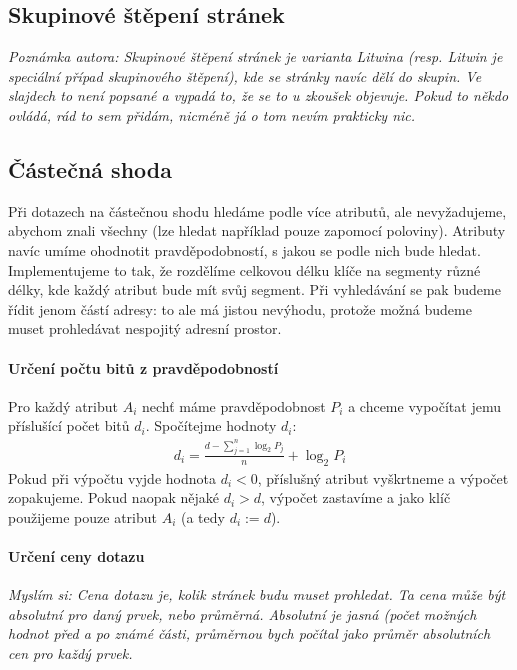 \documentclass[a4paper,12pt]{article}
\begin{document}
\subsection{Skupinové štěpení stránek}
\setcounter{equation}{0}
\textit{Poznámka autora: Skupinové štěpení stránek je varianta Litwina (resp.  
Litwin je speciální případ skupinového štěpení), kde se stránky navíc dělí do 
skupin.  Ve slajdech to není popsané a vypadá to, že se to u zkoušek objevuje.  
Pokud to někdo ovládá, rád to sem přidám, nicméně já o tom nevím prakticky nic.}


\subsection{Částečná shoda}
\setcounter{equation}{0}
Při dotazech na částečnou shodu hledáme podle více atributů, ale nevyžadujeme, 
abychom znali všechny (lze hledat například pouze zapomocí poloviny). Atributy 
navíc umíme ohodnotit pravděpodobností, s jakou se podle nich bude hledat.  
Implementujeme to tak, že rozdělíme celkovou délku klíče na segmenty různé 
délky, kde každý atribut bude mít svůj segment. Při vyhledávání se pak budeme 
řídit jenom částí adresy: to ale má jistou nevýhodu, protože možná budeme muset 
prohledávat nespojitý adresní prostor.

\paragraph{Určení počtu bitů z pravděpodobností}
Pro každý atribut $A_i$ nechť máme pravděpodobnost $P_i$ a chceme vypočítat jemu 
příslušící počet bitů $d_i$. Spočítejme hodnoty $d_i$:
\begin{align}
	d_i = \frac{ d - \sum_{j = 1}^n \log_2 P_j}{n} + \log_2 P_i
\end{align}
Pokud při výpočtu vyjde hodnota $d_i < 0$, příslušný atribut vyškrtneme a 
výpočet zopakujeme. Pokud naopak nějaké $d_i > d$, výpočet zastavíme a jako klíč 
použijeme pouze atribut $A_i$ (a tedy $d_i := d$).

\paragraph{Určení ceny dotazu}
\textit{Myslím si: Cena dotazu je, kolik stránek budu muset prohledat. Ta cena 
může být absolutní pro daný prvek, nebo průměrná. Absolutní je jasná (počet 
možných hodnot před a po známé části, průměrnou bych počítal jako průměr 
absolutních cen pro každý prvek.}
\end{document}
